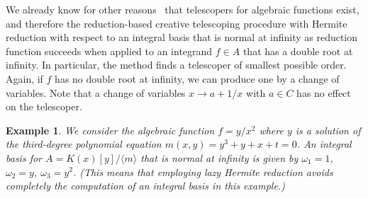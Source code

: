 \documentclass{sig-alternate}
\newtheorem{example}[theorem]{Example}
\begin{document}
We already know for other reasons~\cite{Zeilberger1990,chyzak00,chen12d} that
telescopers for algebraic functions exist, and therefore the re\-duc\-tion-based
creative telescoping procedure with Hermite reduction with respect to an
integral basis that is normal at infinity as reduction function succeeds when
applied to an integrand $f\in A$ that has a double root at infinity.
In particular, the method finds a telescoper of smallest possible order.
Again, if $f$ has no double root at infinity, we can produce one by a change of variables.
Note that a change of variables $x\to a+1/x$ with $a\in C$ has no effect on
the telescoper.

\begin{example}\label{ex:ct}
We consider the algebraic function $f=y/x^2$ where $y$ is a solution of the
third-degree polynomial equation $m(x,y) = y^3 + y + x + t = 0$. An integral
basis for $A=K(x)[y]/\langle m\rangle$ that is normal at infinity is given by
$\omega_1=1$, $\omega_2=y$, $\omega_3=y^2$.  (This means that employing lazy
Hermite reduction avoids completely the computation of an integral basis in
this example.)


\end{example}
\end{document}
